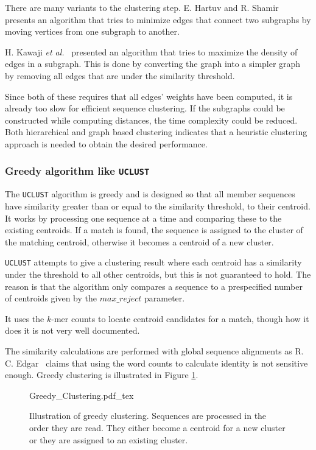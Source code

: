 There are many variants to the clustering step. E. Hartuv and R. Shamir \\
\cite{hartuv} presents an algorithm that tries to minimize edges that
connect two subgraphs by moving vertices from one subgraph to another.

H. Kawaji \textit{et al.}~\cite{kawaji} presented an algorithm that tries to
maximize the density of edges in a subgraph. This is done by converting the
graph into a simpler graph by removing all edges that are under the similarity
threshold.

Since both of these requires that all edges' weights have been computed, it is
already too slow for efficient sequence clustering. If the subgraphs could be
constructed while computing distances, the time complexity could be reduced.
Both hierarchical and graph based clustering indicates that a heuristic
clustering approach is needed to obtain the desired performance.


\subsubsection{Greedy algorithm like \texttt{UCLUST}}

The \texttt{UCLUST} algorithm is greedy and is designed so that all member
sequences have similarity greater than or equal to the similarity threshold,
to their centroid.  It works by processing one sequence at a time and
comparing these to the existing centroids. If a match is found, the sequence
is assigned to the cluster of the matching centroid, otherwise it becomes a
centroid of a new cluster.

\texttt{UCLUST} attempts to give a clustering result where each centroid has a
similarity under the threshold to all other centroids, but this is not
guaranteed to hold. The reason is that the algorithm only compares a sequence
to a prespecified number of centroids given by the $max\_reject$ parameter.

It uses the $k$-mer counts to locate centroid candidates for a match, though
how it does it is not very well documented.

The similarity calculations are performed with global sequence alignments as R.
C. Edgar~\cite{usearch_algorithm}  claims that using the word counts to
calculate identity is not sensitive enough. Greedy clustering is illustrated in
Figure \ref{fig:greedy_clustering}.

\begin{figure}[H]
  \def\svgwidth{\columnwidth}
  {Greedy_Clustering.pdf_tex}
  \caption{Illustration of greedy clustering. Sequences are processed in the
    order they are read. They either become a centroid for a new cluster or
    they are assigned to an existing cluster.}
  \label{fig:greedy_clustering}
\end{figure}

